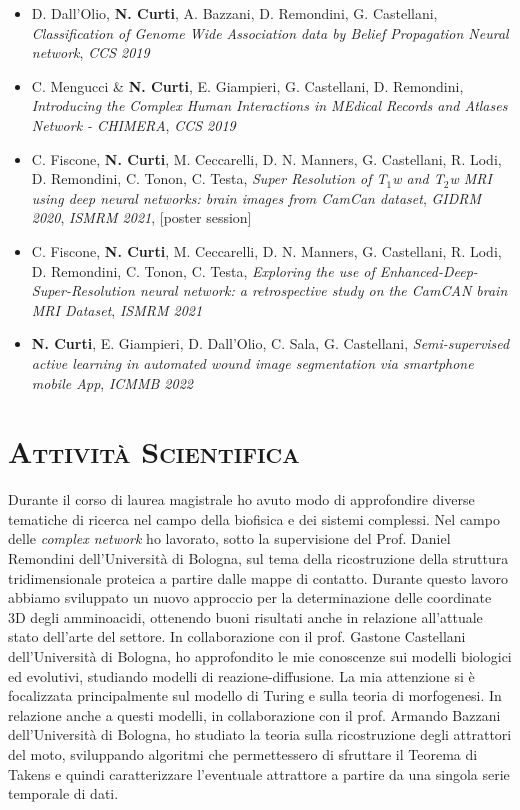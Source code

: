 \documentclass[a4paper,11pt]{article}
\newcommand{\itemicon}[2]{\item[{\texttt{[image: \#2]}}]}
\begin{document}
\begin{itemize}

  \itemicon{0.05}{abstract.png} D. Dall'Olio, \textbf{N. Curti}, A. Bazzani, D. Remondini, G. Castellani, \emph{Classification of Genome Wide Association data by Belief Propagation Neural network}, \emph{CCS 2019}

  \itemicon{0.05}{abstract.png} C. Mengucci \& \textbf{N. Curti}, E. Giampieri, G. Castellani, D. Remondini, \emph{Introducing the Complex Human Interactions in MEdical Records and Atlases Network - CHIMERA}, \emph{CCS 2019}

  \itemicon{0.05}{poster.png} C. Fiscone, \textbf{N. Curti}, M. Ceccarelli, D. N. Manners, G. Castellani, R. Lodi, D. Remondini, C. Tonon, C. Testa, \emph{Super Resolution of T$_1$w and T$_2$w MRI using deep neural networks: brain images from CamCan dataset}, \emph{GIDRM 2020}, \emph{ISMRM 2021}, [poster session]

  \itemicon{0.05}{abstract.png} C. Fiscone, \textbf{N. Curti}, M. Ceccarelli, D. N. Manners, G. Castellani, R. Lodi, D. Remondini, C. Tonon, C. Testa, \emph{Exploring the use of Enhanced-Deep-Super-Resolution neural network: a retrospective study on the CamCAN brain MRI Dataset}, \emph{ISMRM 2021}

  \itemicon{0.05}{abstract.png} \textbf{N. Curti}, E. Giampieri, D. Dall'Olio, C. Sala, G. Castellani, \emph{Semi-supervised active learning in automated wound image segmentation via smartphone mobile App}, \emph{ICMMB 2022}

\end{itemize}




\vspace*{0.5cm}
\section*{\scshape{Attività Scientifica}}

Durante il corso di laurea magistrale ho avuto modo di approfondire diverse tematiche di ricerca nel campo della biofisica e dei sistemi complessi.
Nel campo delle \emph{complex network} ho lavorato, sotto la supervisione del Prof. Daniel Remondini dell'Università di Bologna, sul tema della ricostruzione della struttura tridimensionale proteica a partire dalle mappe di contatto.
Durante questo lavoro abbiamo sviluppato un nuovo approccio per la determinazione delle coordinate 3D degli amminoacidi, ottenendo buoni risultati anche in relazione all'attuale stato dell'arte del settore.
In collaborazione con il prof. Gastone Castellani dell'Università di Bologna, ho approfondito le mie conoscenze sui modelli biologici ed evolutivi, studiando modelli di reazione-diffusione.
La mia attenzione si è focalizzata principalmente sul modello di Turing e sulla teoria di morfogenesi.
In relazione anche a questi modelli, in collaborazione con il prof. Armando Bazzani dell'Università di Bologna, ho studiato la teoria sulla ricostruzione degli attrattori del moto, sviluppando algoritmi che permettessero di sfruttare il Teorema di Takens e quindi caratterizzare l'eventuale attrattore a partire da una singola serie temporale di dati.
\end{document}
